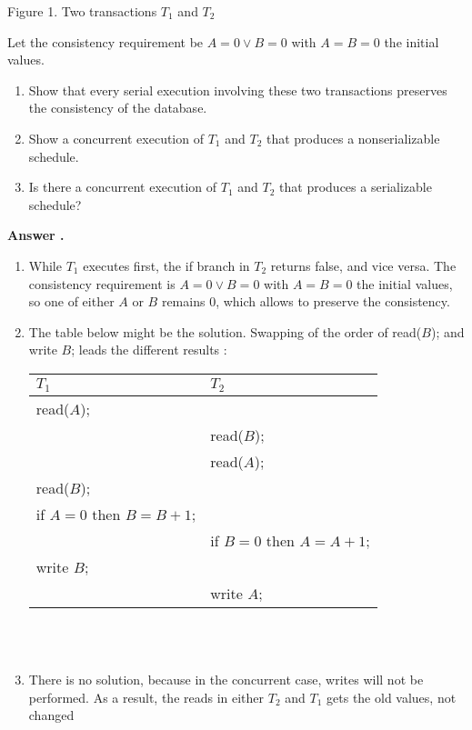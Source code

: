 \documentclass[paper=8.27in:11.69in, 14pt, DIV=calc]{scrartcl}
\newcounter{answers}
\newcommand\printanswers{\refstepcounter{answers}\theanswers}
\begin{document}
\begin{center}
Figure 1. Two transactions $T_{1}$ and $T_{2}$\\
\end{center}

Let the consistency requirement be $A = 0 \vee B = 0$ with $A = B = 0$ the initial values.

\begin{enumerate}[label=\alph*.]

\item Show that every serial execution involving these two transactions preserves the consistency of the database.
\item Show a concurrent execution of $T_{1}$ and $T_{2}$ that produces a nonserializable schedule.
\item Is there a concurrent execution of $T_{1}$ and $T_{2}$ that produces a serializable schedule?

\end{enumerate}

\textbf{Answer \printanswers .}

\begin{enumerate}[label=\alph*.]

\item While $T_{1}$ executes first, the if branch in $T_{2}$ returns false, and vice versa. The consistency requirement is $A = 0 \vee B = 0$ with $A = B = 0$ the initial values, so one of either $A$ or $B$ remains $0$, which allows to preserve the consistency.

\item The table below might be the solution. Swapping of the order of read($B$); and write $B$; leads the different results :\\

\begin{tabular}{|l|l|}
\hline
$T_{1}$ & $T_{2}$ \\ \hline
read($A$); &  \\ \hline
 & read($B$); \\ \hline
 & read($A$); \\ \hline
read($B$); &  \\ \hline
if $A = 0$ then $B = B + 1$; &  \\ \hline
 & if $B = 0$ then $A = A + 1$; \\ \hline
write $B$; &  \\ \hline
 & write $A$; \\ \hline
\end{tabular}
\\
\\
\item There is no solution, because in the concurrent case, writes will not be performed. As a result, the reads in either $T_{2}$ and $T_{1}$ gets the old values, not changed

\end{enumerate}
\end{document}
